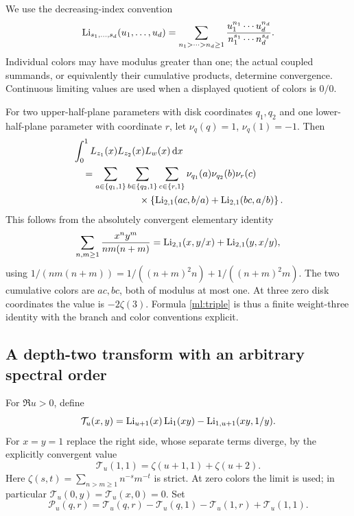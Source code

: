 We use the decreasing-index convention
\begin{equation}\label{ml:MPL}
 \operatorname{Li}_{s_1,\ldots,s_d}(u_1,\ldots,u_d)
 =\sum_{n_1>\cdots>n_d\ge1}
       \frac{u_1^{n_1}\cdots u_d^{n_d}}
            {n_1^{s_1}\cdots n_d^{s_d}}.
\end{equation}
Individual colors may have modulus greater than one; the actual coupled
summands, or equivalently their cumulative products, determine
convergence. Continuous limiting values are used when a displayed
quotient of colors is $0/0$.

For two upper-half-plane parameters with disk coordinates $q_1,q_2$
and one lower-half-plane parameter with coordinate $r$, let
$\nu_q(q)=1$, $\nu_q(1)=-1$. Then
\begin{align}
 &\int_0^1L_{z_1}(x)L_{z_2}(x)L_w(x)\dd x\notag\\
 &\quad=\sum_{a\in\{q_1,1\}}
        \sum_{b\in\{q_2,1\}}
        \sum_{c\in\{r,1\}}
        \nu_{q_1}(a)\nu_{q_2}(b)\nu_r(c)\notag\\
 &\hspace{24mm}\times
       \left\{\Li_{2,1}(ac,b/a)+\Li_{2,1}(bc,a/b)\right\}.
       \label{ml:triple}
\end{align}
This follows from the absolutely convergent elementary identity
\[
 \sum_{n,m\ge1}\frac{x^ny^m}{nm(n+m)}
     =\operatorname{Li}_{2,1}(x,y/x)+\operatorname{Li}_{2,1}(y,x/y),
\]
using $1/(nm(n+m))=1/((n+m)^2n)+1/((n+m)^2m)$.
The two cumulative colors are $ac,bc$, both of modulus at most one.
At three zero disk coordinates the value is $-2\zeta(3)$.
Formula \eqref{ml:triple} is thus a finite weight-three identity with
the branch and color conventions explicit.

\subsection{A depth-two transform with an arbitrary spectral order}

For $\Re u>0$, define
\begin{equation}\label{ml:Tu}
 \mathcal T_u(x,y)
       =\operatorname{Li}_{u+1}(x)\operatorname{Li}_1(xy)
                              -\operatorname{Li}_{1,u+1}(xy,1/y).
\end{equation}
For $x=y=1$ replace the right side, whose separate terms diverge, by
the explicitly convergent value
\begin{equation}\label{ml:T11}
       \mathcal T_u(1,1)=\zeta(u+1,1)+\zeta(u+2).
\end{equation}
Here $\zeta(s,t)=\sum_{n>m\ge1}n^{-s}m^{-t}$ is strict. At zero
colors the limit is used; in particular $\mathcal T_u(0,y)=
\mathcal T_u(x,0)=0$. Set
\begin{equation}\label{ml:Pu}
 \mathcal P_u(q,r)=\mathcal T_u(q,r)-\mathcal T_u(q,1)
                              -\mathcal T_u(1,r)+\mathcal T_u(1,1).
\end{equation}


